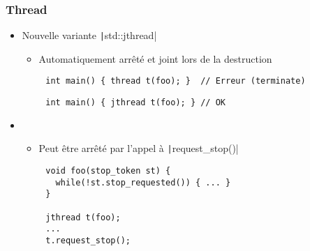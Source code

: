 \documentclass[C++.tex]{subfiles}
\begin{document}
\begin{frame}[fragile]
	\frametitle{Thread}
	\begin{itemize}
		\item Nouvelle variante \texttt|std::jthread|
		\begin{itemize}
			\item Automatiquement arrêté et joint lors de la destruction
		\end{itemize}
	\end{itemize}


	\begin{verbatim}
		int main() { thread t(foo); }  // Erreur (terminate)
	\end{verbatim}


	\begin{verbatim}
		int main() { jthread t(foo); } // OK
	\end{verbatim}

	\begin{itemize}
		\item [] \begin{itemize}
			\item Peut être arrêté par l'appel à \texttt|request_stop()|
		\end{itemize}
	\end{itemize}

	\begin{verbatim}
		void foo(stop_token st) {
		  while(!st.stop_requested()) { ... }
		}

		jthread t(foo);
		...
		t.request_stop();
	\end{verbatim}


\end{frame}
\end{document}
